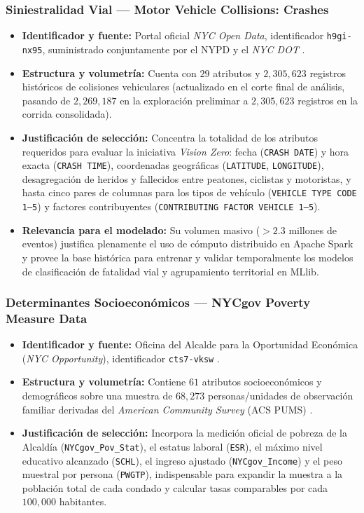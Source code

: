 \documentclass[11pt,a4paper]{article}
\begin{document}
\subsubsection{Siniestralidad Vial --- Motor Vehicle Collisions: Crashes}
\begin{itemize}
    \item \textbf{Identificador y fuente:} Portal oficial \textit{NYC Open Data}, identificador \texttt{h9gi-nx95}, suministrado conjuntamente por el NYPD y el \textit{NYC DOT} \cite{nyc_collisions_crashes_2026}.
    \item \textbf{Estructura y volumetría:} Cuenta con $29$ atributos y $2,305,623$ registros históricos de colisiones vehiculares (actualizado en el corte final de análisis, pasando de $2,269,187$ en la exploración preliminar a $2,305,623$ registros en la corrida consolidada).
    \item \textbf{Justificación de selección:} Concentra la totalidad de los atributos requeridos para evaluar la iniciativa \textit{Vision Zero}: fecha (\texttt{CRASH DATE}) y hora exacta (\texttt{CRASH TIME}), coordenadas geográficas (\texttt{LATITUDE}, \texttt{LONGITUDE}), desagregación de heridos y fallecidos entre peatones, ciclistas y motoristas, y hasta cinco pares de columnas para los tipos de vehículo (\texttt{VEHICLE TYPE CODE 1--5}) y factores contribuyentes (\texttt{CONTRIBUTING FACTOR VEHICLE 1--5}).
    \item \textbf{Relevancia para el modelado:} Su volumen masivo ($>2.3$ millones de eventos) justifica plenamente el uso de cómputo distribuido en Apache Spark y provee la base histórica para entrenar y validar temporalmente los modelos de clasificación de fatalidad vial y agrupamiento territorial en MLlib.
\end{itemize}

\subsubsection{Determinantes Socioeconómicos --- NYCgov Poverty Measure Data}
\begin{itemize}
    \item \textbf{Identificador y fuente:} Oficina del Alcalde para la Oportunidad Económica (\textit{NYC Opportunity}), identificador \texttt{cts7-vksw} \cite{nyc_poverty_data_2018}.
    \item \textbf{Estructura y volumetría:} Contiene $61$ atributos socioeconómicos y demográficos sobre una muestra de $68,273$ personas/unidades de observación familiar derivadas del \textit{American Community Survey} (ACS PUMS) \cite{acs_pums_dict_2018}.
    \item \textbf{Justificación de selección:} Incorpora la medición oficial de pobreza de la Alcaldía (\texttt{NYCgov\_Pov\_Stat}), el estatus laboral (\texttt{ESR}), el máximo nivel educativo alcanzado (\texttt{SCHL}), el ingreso ajustado (\texttt{NYCgov\_Income}) y el peso muestral por persona (\texttt{PWGTP}), indispensable para expandir la muestra a la población total de cada condado y calcular tasas comparables por cada $100,000$ habitantes.
\end{itemize}
\end{document}

